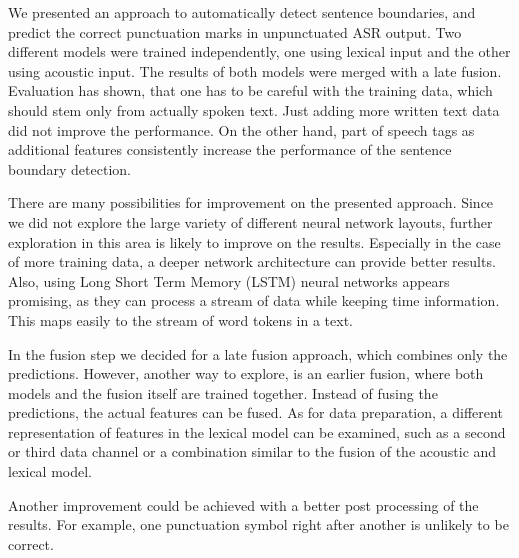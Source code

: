 We presented an approach to automatically detect sentence boundaries, and predict the correct punctuation marks in unpunctuated ASR output.
Two different models were trained independently, one using lexical input and the other using acoustic input.
The results of both models were merged with a late fusion.
Evaluation has shown, that one has to be careful with the training data, which should stem only from actually spoken text.
Just adding more written text data did not improve the performance.
On the other hand, part of speech tags as additional features consistently increase the performance of the sentence boundary detection.

There are many possibilities for improvement on the presented approach.
Since we did not explore the large variety of different neural network layouts, further exploration in this area is likely to improve on the results.
Especially in the case of more training data, a deeper network architecture can provide better results.
Also, using Long Short Term Memory (LSTM) neural networks appears promising, as they can process a stream of data while keeping time information.
This maps easily to the stream of word tokens in a text.

In the fusion step we decided for a late fusion approach, which combines only the predictions.
However, another way to explore, is an earlier fusion, where both models and the fusion itself are trained together.
Instead of fusing the predictions, the actual features can be fused.
As for data preparation, a different representation of features in the lexical model can be examined, such as a second or third data channel or a combination similar to the fusion of the acoustic and lexical model.

Another improvement could be achieved with a better post processing of the results.
For example, one punctuation symbol right after another is unlikely to be correct.
